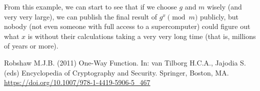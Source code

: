 \documentclass[14pt, letter]{amsart}
\begin{document}
From this example, we can start to see that if we choose $g$ and $m$ wisely (and very very large), we can publish the final result of $g^x\pmod{m}$ publicly, but nobody (not even someone with full access to a supercomputer) could figure out what $x$ is without their calculations taking a very very long time (that is, millions of years or more). 



\begin{thebibliography}{}



 Robshaw M.J.B. (2011) One-Way Function. In: van Tilborg H.C.A., Jajodia S. (eds) Encyclopedia of Cryptography and Security. Springer, Boston, MA. \url{https://doi.org/10.1007/978-1-4419-5906-5_467}




\end{thebibliography}
\end{document}
